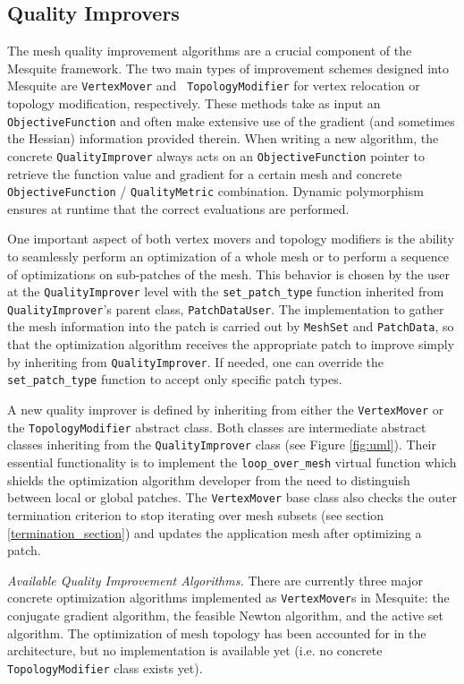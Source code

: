\documentclass[psfig]{article}
\begin{document}
\subsection{Quality Improvers}

The mesh quality improvement algorithms are a crucial component of the
Mesquite framework.  The two main types of improvement schemes
designed into Mesquite are {\tt VertexMover} and {\tt
TopologyModifier} for vertex relocation or topology modification,
respectively.  These methods take as input an {\tt ObjectiveFunction}
and often make extensive use of the gradient (and sometimes the
Hessian) information provided therein.  When writing a new algorithm,
the concrete \texttt{QualityImprover} always acts on an
\texttt{ObjectiveFunction} pointer to retrieve the function value and
gradient for a certain mesh and concrete \texttt{ObjectiveFunction} /
\texttt{QualityMetric} combination.  Dynamic polymorphism ensures at
runtime that the correct evaluations are performed.

One important aspect of both vertex movers and topology modifiers is
the ability to seamlessly perform an optimization of a whole mesh or
to perform a sequence of optimizations on sub-patches of the mesh.
This behavior is chosen by the user at the \texttt{QualityImprover}
level with the \texttt{set\_patch\_type} function inherited from
\texttt{QualityImprover}'s parent class, \texttt{PatchDataUser}. The
implementation to gather the mesh information into the patch is
carried out by \texttt{MeshSet} and \texttt{PatchData}, so that the
optimization algorithm receives the appropriate patch to improve
simply by inheriting from \texttt{QualityImprover}.  If needed, one can 
override the \texttt{set\_patch\_type} function to accept only specific
patch types.

A new quality improver is defined by inheriting from either the
\texttt{VertexMover} or the \texttt{TopologyModifier} abstract class.
Both classes are intermediate abstract classes inheriting from the
\texttt{QualityImprover} class (see Figure \ref{fig:uml}).  Their
essential functionality is to implement the \texttt{loop\_over\_mesh}
virtual function which shields the optimization algorithm developer
from the need to distinguish between local or global patches.  The
{\tt VertexMover} base class also checks the outer termination
criterion to stop iterating over mesh subsets (see section
\ref{termination_section}) and updates the application mesh after
optimizing a patch.

{\it Available Quality Improvement Algorithms.}  There are currently
three major concrete optimization algorithms implemented as {\tt VertexMover}s
in Mesquite: the conjugate gradient algorithm, the feasible Newton
algorithm, and the active set algorithm. The optimization of mesh
topology has been accounted for in the architecture, but no
implementation is available yet (i.e. no concrete
\texttt{TopologyModifier} class exists yet).
\end{document}
